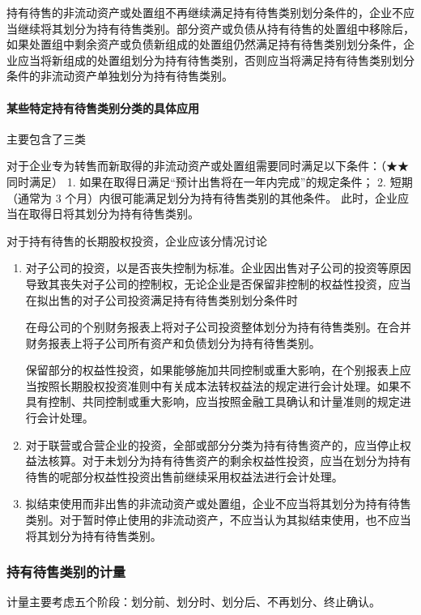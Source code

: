 \documentclass[UTF8,12pt]{ctexart}
\numberwithin{equation}{section} %
\numberwithin{figure}{section}
\numberwithin{table}{section}
\begin{document}
	持有待售的非流动资产或处置组不再继续满足持有待售类别划分条件的，企业不应当继续将其划分为持有待售类别。部分资产或负债从持有待售的处置组中移除后，如果处置组中剩余资产或负债新组成的处置组仍然满足持有待售类别划分条件，企业应当将新组成的处置组划分为持有待售类别，否则应当将满足持有待售类别划分条件的非流动资产单独划分为持有待售类别。
	
	\paragraph{某些特定持有待售类别分类的具体应用}
	主要包含了三类
	
	对于企业专为转售而新取得的非流动资产或处置组需要同时满足以下条件：（★★同时满足）
	1.	如果在取得日满足“预计出售将在一年内完成”的规定条件；
	2.	短期（通常为 3 个月）内很可能满足划分为持有待售类别的其他条件。
	此时，企业应当在取得日将其划分为持有待售类别。
	
	对于持有待售的长期股权投资，企业应该分情况讨论
	\begin{enumerate}
		\item 对子公司的投资，以是否丧失控制为标准。企业因出售对子公司的投资等原因导致其丧失对子公司的控制权，无论企业是否保留非控制的权益性投资，应当在拟出售的对子公司投资满足持有待售类别划分条件时
		
		在母公司的个别财务报表上将对子公司投资整体划分为持有待售类别。在合并财务报表上将子公司所有资产和负债划分为持有待售类别。
		
		保留部分的权益性投资，如果能够施加共同控制或重大影响，在个别报表上应当按照长期股权投资准则中有关成本法转权益法的规定进行会计处理。如果不具有控制、共同控制或重大影响，应当按照金融工具确认和计量准则的规定进行会计处理。
		
		\item 对于联营或合营企业的投资，全部或部分分类为持有待售资产的，应当停止权益法核算。对于未划分为持有待售资产的剩余权益性投资，应当在划分为持有待售的呢部分权益性投资出售前继续采用权益法进行会计处理。
		
		\item 拟结束使用而非出售的非流动资产或处置组，企业不应当将其划分为持有待售类别。对于暂时停止使用的非流动资产，不应当认为其拟结束使用，也不应当将其划分为持有待售类别。
	\end{enumerate}

	\subsubsection{持有待售类别的计量}
	计量主要考虑五个阶段：划分前、划分时、划分后、不再划分、终止确认。
	
\end{document}
